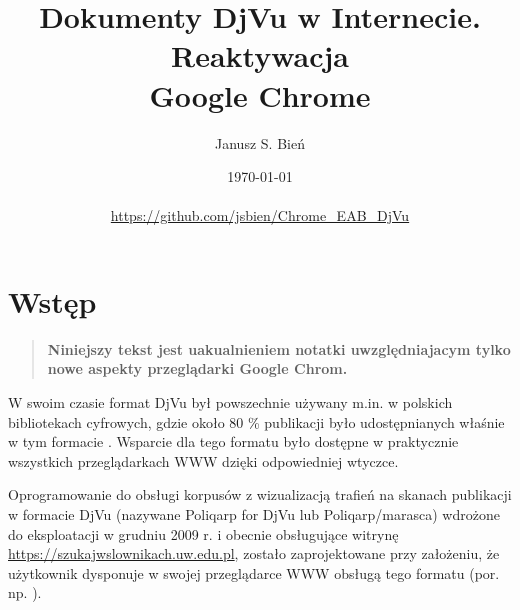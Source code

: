 \documentclass[withmarginpar]{mwart}
\begin{document}
\renewcommand{\figurename}{Ilustracja}

\title{Dokumenty DjVu w Internecie.\\Reaktywacja\\Google Chrome}

\author{Janusz S. Bień}


\date{\today\\\doclicenseLongName\\\url{https://github.com/jsbien/Chrome_EAB_DjVu}}

\maketitle

\section{Wstęp}{}

\begin{quote}
\textbf{  Niniejszy tekst jest uakualnieniem notatki
  \autocite{bien_dokumenty_2020} uwzględniajacym tylko nowe aspekty
  przeglądarki \textsf{Google Chrom}.}
\end{quote}

W swoim czasie format DjVu był powszechnie używany m.in. w polskich
bibliotekach cyfrowych, gdzie około 80 \% publikacji było
udostępnianych właśnie w tym formacie \autocite[s. 311]{bc165}. Wsparcie dla tego
formatu było dostępne w praktycznie wszystkich przeglądarkach WWW dzięki
 odpowiedniej wtyczce.




 Oprogramowanie do obsługi korpusów z wizualizacją trafień na skanach
 publikacji w formacie DjVu (nazywane \textsf{Poliqarp for DjVu} lub
 \textsf{Poliqarp/marasca}) wdrożone do eksploatacji w grudniu 2009
 r. i obecnie obsługujące witrynę
 \url{https://szukajwslownikach.uw.edu.pl}, zostało zaprojektowane
 przy założeniu, że użytkownik dysponuje w swojej przeglądarce WWW
 obsługą tego formatu (por. np. \cite{bc322}).
\end{document}
